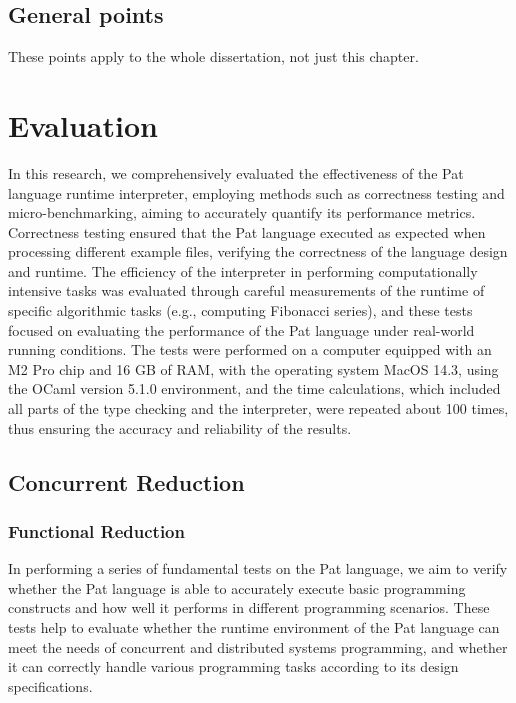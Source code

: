 \documentclass{l4proj}
\begin{document}
\section{General points}

These points apply to the whole dissertation, not just this chapter.





\chapter{Evaluation} 
In this research, we comprehensively evaluated the effectiveness of the Pat language runtime interpreter, employing methods such as correctness testing and micro-benchmarking, aiming to accurately quantify its performance metrics. Correctness testing ensured that the Pat language executed as expected when processing different example files, verifying the correctness of the language design and runtime. The efficiency of the interpreter in performing computationally intensive tasks was evaluated through careful measurements of the runtime of specific algorithmic tasks (e.g., computing Fibonacci series), and these tests focused on evaluating the performance of the Pat language under real-world running conditions. The tests were performed on a computer equipped with an M2 Pro chip and 16 GB of RAM, with the operating system MacOS 14.3, using the OCaml version 5.1.0 environment, and the time calculations, which included all parts of the type checking and the interpreter, were repeated about 100 times, thus ensuring the accuracy and reliability of the results.

\section{Concurrent Reduction}

\subsection{Functional Reduction}
In performing a series of fundamental tests on the Pat language, we aim to verify whether the Pat language is able to accurately execute basic programming constructs and how well it performs in different programming scenarios. These tests help to evaluate whether the runtime environment of the Pat language can meet the needs of concurrent and distributed systems programming, and whether it can correctly handle various programming tasks according to its design specifications.
\end{document}

